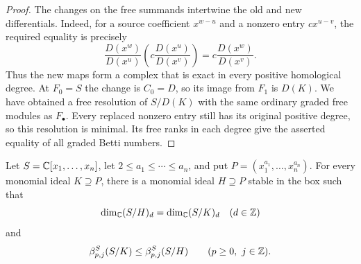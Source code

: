 \begin{proof}
The changes on the free summands intertwine the old and new
differentials.  Indeed, for a source coefficient $x^{w-u}$ and a
nonzero entry $c x^{u-v}$, the required equality is precisely
\[
 \frac{D(x^w)}{D(x^u)}
 \left(c\frac{D(x^u)}{D(x^v)}\right)
      =c\frac{D(x^w)}{D(x^v)}.
\]
Thus the new maps form a complex that is exact in every positive
homological degree.  At $F_0=S$ the change is $C_0=D$, so its image
from $F_1$ is $D(K)$.  We have obtained a free resolution of $S/D(K)$
with the same ordinary graded free modules as $F_\bullet$.
Every replaced nonzero entry still has its original positive degree,
so this resolution is minimal.  Its free ranks in each degree give
the asserted equality of all graded Betti numbers.
\end{proof}

\begin{proposition}
\label{stab:main}
Let $S=\mathbb C[x_1,\ldots,x_n]$, let $2\le a_1\le\cdots\le a_n$,
and put $P=(x_1^{a_1},\ldots,x_n^{a_n})$.
For every monomial ideal $K\supseteq P$, there is a monomial ideal
$H\supseteq P$ stable in the box such that
\[
 \dim_\mathbb C(S/H)_d=\dim_\mathbb C(S/K)_d\quad(d\in\mathbb Z)
\]
and
\[
 \beta^S_{p,j}(S/K)\le\beta^S_{p,j}(S/H)
 \qquad(p\ge0,\ j\in\mathbb Z).
\]
\end{proposition}

